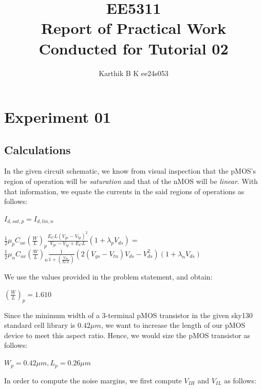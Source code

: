 \documentclass[12pt,a4paper]{article}
\begin{document}
\title{EE5311 \\ Report of Practical Work Conducted for Tutorial 02}
\author{Karthik B K ee24s053}
\maketitle

\section{Experiment 01}
\subsection{Calculations}
In the given circuit schematic, we know from visual inspection that the pMOS's region of operation will be \emph{saturation} and that of the nMOS will be \emph{linear}. With that information, we equate the currents in the said regions of operations as follows:

\doublespacing
\begin{center}
    $I_{d,sat,p} = I_{d,lin,n}$
\end{center}
\begin{center}
    $\frac{1}{2}\mu_{p}C_{ox}(\frac{W}{L})_{p}\frac{E_{C}L(V_{gs}-V_{tp})^{2}}{V_{gs}-V_{tp}+E_{C}L}(1+\lambda_{p} V_{ds}) = $\\$\frac{1}{2}\mu_{n}C_{ox}(\frac{W}{L})_{n}\frac{1}{1+(\frac{V_{ds}}{E_{C}L})}(2(V_{gs}-V_{tn})V_{ds}-V_{ds}^2)(1+\lambda_{n} V_{ds})$
\end{center}
\singlespacing

\noindent We use the values provided in the problem statement, and obtain:

\doublespacing
\begin{center}
    $(\frac{W}{L})_{p} = 1.610$
\end{center}
\singlespacing

\noindent Since the minimum width of a 3-terminal pMOS transistor in the given sky130 standard cell library is $0.42 \mu m$, we want to increase the length of our pMOS device to meet this aspect ratio. Hence, we would size the pMOS transistor as follows:

\doublespacing
\begin{center}
    $W_{p} = 0.42 \mu m, L_{p} = 0.26 \mu m$
\end{center}
\singlespacing

\noindent In order to compute the noise margins, we first compute $V_{IH}$ and $V_{IL}$ as follows:
\end{document}
